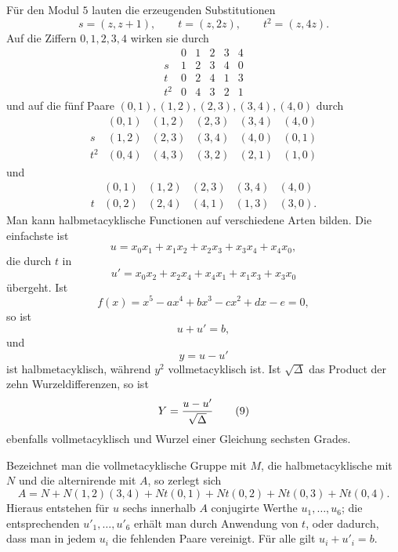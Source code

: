 \documentclass[11pt]{article}
\begin{document}
Für den Modul $5$ lauten die erzeugenden Substitutionen
\[
  s=(z,z+1),\qquad t=(z,2z),\qquad t^2=(z,4z).
\]
Auf die Ziffern $0,1,2,3,4$ wirken sie durch
\[
\begin{array}{c|ccccc}
     &0&1&2&3&4\\ \hline
s    &1&2&3&4&0\\
t    &0&2&4&1&3\\
t^2  &0&4&3&2&1
\end{array}                                                       \tag{1}
\]
und auf die fünf Paare $(0,1),(1,2),(2,3),(3,4),(4,0)$ durch
\[
\begin{array}{c|ccccc}
      &(0,1)&(1,2)&(2,3)&(3,4)&(4,0)\\ \hline
s     &(1,2)&(2,3)&(3,4)&(4,0)&(0,1)\\
t^2   &(0,4)&(4,3)&(3,2)&(2,1)&(1,0)
\end{array}                                                       \tag{2}
\]
und
\[
\begin{array}{c|ccccc}
      &(0,1)&(1,2)&(2,3)&(3,4)&(4,0)\\ \hline
t     &(0,2)&(2,4)&(4,1)&(1,3)&(3,0).
\end{array}                                                       \tag{3}
\]
Man kann halbmetacyklische Functionen auf verschiedene Arten bilden. Die einfachste ist
\[
  u=x_0x_1+x_1x_2+x_2x_3+x_3x_4+x_4x_0,                         \tag{4}
\]
die durch $t$ in
\[
  u'=x_0x_2+x_2x_4+x_4x_1+x_1x_3+x_3x_0                          \tag{5}
\]
übergeht. Ist
\[
  f(x)=x^5-ax^4+bx^3-cx^2+dx-e=0,                                \tag{6}
\]
so ist
\[
  u+u'=b,                                                         \tag{7}
\]
und
\[
  y=u-u'                                                          \tag{8}
\]
ist halbmetacyklisch, während $y^2$ vollmetacyklisch ist. Ist $\sqrt\Delta$ das Product der zehn Wurzeldifferenzen, so ist
\[
  Y={u-u'\over\sqrt\Delta}                                       \tag{9}
\]
ebenfalls vollmetacyklisch und Wurzel einer Gleichung sechsten Grades.

Bezeichnet man die vollmetacyklische Gruppe mit $M$, die halbmetacyklische mit $N$ und die alternirende mit $A$, so zerlegt sich
\[
 A=N+N(1,2)(3,4)+Nt(0,1)+Nt(0,2)+Nt(0,3)+Nt(0,4).                \tag{10}
\]
Hieraus entstehen für $u$ sechs innerhalb $A$ conjugirte Werthe $u_1,\ldots,u_6$; die entsprechenden $u'_1,\ldots,u'_6$ erhält man durch Anwendung von $t$, oder dadurch, dass man in jedem $u_i$ die fehlenden Paare vereinigt. Für alle gilt $u_i+u'_i=b$.
\end{document}
